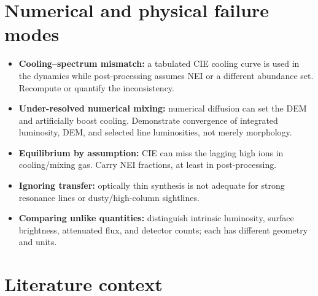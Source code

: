 \documentclass[english,a4paper]{my_memo2}
\begin{document}
\section{Numerical and physical failure modes}

\begin{itemize}[leftmargin=*]
\item \textbf{Cooling--spectrum mismatch:} a tabulated CIE cooling curve is
used in the dynamics while post-processing assumes NEI or a different
abundance set.  Recompute or quantify the inconsistency.
\item \textbf{Under-resolved numerical mixing:} numerical diffusion can set
the DEM and artificially boost cooling.  Demonstrate convergence of integrated
luminosity, DEM, and selected line luminosities, not merely morphology.
\item \textbf{Equilibrium by assumption:} CIE can miss the lagging high ions
in cooling/mixing gas.  Carry NEI fractions, at least in post-processing.
\item \textbf{Ignoring transfer:} optically thin synthesis is not adequate
for strong resonance lines or dusty/high-column sightlines.
\item \textbf{Comparing unlike quantities:} distinguish intrinsic luminosity,
surface brightness, attenuated flux, and detector counts; each has different
geometry and units.
\end{itemize}

\section{Literature context}
\end{document}
